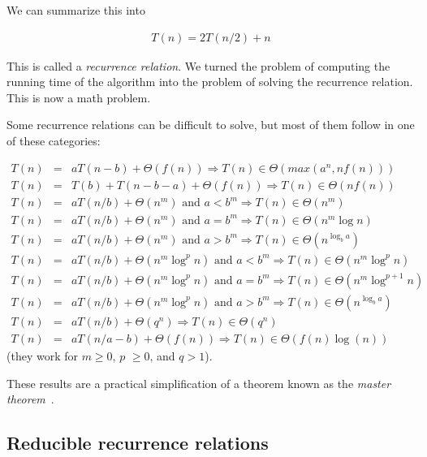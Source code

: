 \documentclass[justified,sixbynine]{tufte-book}
\theoremstyle{plain}%
\theoremstyle{definition}
\theoremstyle{remark}
\begin{document}
\begin{fullwidth}
We can summarize this into

\begin{eqnarray}
T(n) = 2T(n/2) + n
\end{eqnarray}

This is called a {\it recurrence relation}. We turned the problem of computing the running time of the algorithm into the problem of solving the recurrence relation. This is now a math problem.

Some recurrence relations can be difficult to solve, but most of them follow in one of these categories:

\begin{eqnarray}
T(n) \!\!\!&=&\!\!\!aT(n-b)+\Theta (f(n))\Rightarrow T(n)\in \Theta (max(a^n,nf(n))) \\
T(n) \!\!\!&=&\!\!\!T(b)+T(n-b-a)+\Theta(f(n))\Rightarrow T(n)\in \Theta (nf(n)) \\
T(n) \!\!\!&=&\!\!\!aT(n/b)+\Theta (n^m)\text{ and }a<b^m\Rightarrow T(n)\in \Theta (n^m) \\
T(n) \!\!\!&=&\!\!\!aT(n/b)+\Theta (n^m)\text{ and }a=b^m\Rightarrow T(n)\in \Theta
(n^m\log n) \\
T(n) \!\!\!&=&\!\!\!aT(n/b)+\Theta (n^m)\text{ and }a>b^m\Rightarrow T(n)\in \Theta
(n^{\log _ba}) \\
T(n) \!\!\!&=&\!\!\!aT(n/b)+\Theta (n^m\log ^pn)\text{ and }a<b^m\Rightarrow T(n)\in
\Theta (n^m\log ^pn) \\
T(n) \!\!\!&=&\!\!\!aT(n/b)+\Theta (n^m\log ^pn)\text{ and }a=b^m\Rightarrow T(n)\in
\Theta (n^m\log ^{p+1}n) \\
T(n) \!\!\!&=&\!\!\!aT(n/b)+\Theta (n^m\log ^pn)\text{ and }a>b^m\Rightarrow T(n)\in
\Theta (n^{\log _ba}) \\
T(n) \!\!\!&=&\!\!\!aT(n/b)+\Theta (q^n)\Rightarrow T(n)\in \Theta (q^n) \\
T(n) \!\!\!&=&\!\!\!aT(n/a-b)+\Theta (f(n)) \Rightarrow T(n)\in \Theta (f(n)\log(n))
\end{eqnarray}
(they work for $m\geq 0$, $p$ $\geq 0$, and $q>1$).


These results are a practical simplification of a theorem known as the {\it master theorem}~\cite{mastertheorem}.

\goodbreak\subsection{Reducible recurrence relations}


\end{fullwidth}
\end{document}
